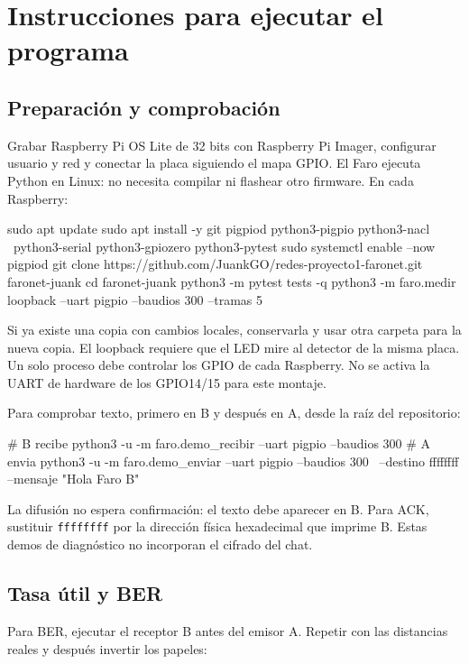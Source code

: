 \documentclass[11pt,letterpaper]{article}
\begin{document}
\section{Instrucciones para ejecutar el programa}

\subsection{Preparación y comprobación}

Grabar Raspberry Pi OS Lite de 32 bits con Raspberry Pi Imager, configurar
usuario y red y conectar la placa siguiendo el mapa GPIO. El Faro ejecuta Python
en Linux: no necesita compilar ni flashear otro firmware. En cada Raspberry:

\begin{codigo}
sudo apt update
sudo apt install -y git pigpiod python3-pigpio python3-nacl \
  python3-serial python3-gpiozero python3-pytest
sudo systemctl enable --now pigpiod
git clone https://github.com/JuankGO/redes-proyecto1-faronet.git faronet-juank
cd faronet-juank
python3 -m pytest tests -q
python3 -m faro.medir loopback --uart pigpio --baudios 300 --tramas 5
\end{codigo}

Si ya existe una copia con cambios locales, conservarla y usar otra carpeta para
la nueva copia. El loopback requiere que el LED mire al detector de la misma
placa. Un solo proceso debe controlar los GPIO de cada Raspberry. No se activa
la UART de hardware de los GPIO14/15 para este montaje.

Para comprobar texto, primero en B y después en A, desde la raíz del repositorio:

\begin{codigo}
# B recibe
python3 -u -m faro.demo_recibir --uart pigpio --baudios 300
# A envia
python3 -u -m faro.demo_enviar --uart pigpio --baudios 300 \
  --destino ffffffff --mensaje "Hola Faro B"
\end{codigo}

La difusión no espera confirmación: el texto debe aparecer en B. Para ACK,
sustituir \texttt{ffffffff} por la dirección física hexadecimal que imprime B.
Estas demos de diagnóstico no incorporan el cifrado del chat.

\subsection{Tasa útil y BER}

Para BER, ejecutar el receptor B antes del emisor A. Repetir con las distancias
reales y después invertir los papeles:
\end{document}
